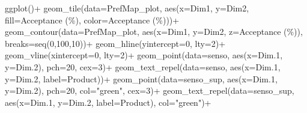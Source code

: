 \documentclass[
]{book}
\newenvironment{Shaded}{\begin{snugshade}}{\end{snugshade}}
\newcommand{\AttributeTok}[1]{\textcolor[rgb]{0.77,0.63,0.00}{#1}}
\newcommand{\DecValTok}[1]{\textcolor[rgb]{0.00,0.00,0.81}{#1}}
\newcommand{\FloatTok}[1]{\textcolor[rgb]{0.00,0.00,0.81}{#1}}
\newcommand{\FunctionTok}[1]{\textcolor[rgb]{0.00,0.00,0.00}{#1}}
\newcommand{\NormalTok}[1]{#1}
\newcommand{\SpecialCharTok}[1]{\textcolor[rgb]{0.00,0.00,0.00}{#1}}
\newcommand{\StringTok}[1]{\textcolor[rgb]{0.31,0.60,0.02}{#1}}
\begin{document}
\begin{Shaded}
\begin{Highlighting}[]
\FunctionTok{ggplot}\NormalTok{()}\SpecialCharTok{+}
  \FunctionTok{geom\_tile}\NormalTok{(}\AttributeTok{data=}\NormalTok{PrefMap\_plot, }\FunctionTok{aes}\NormalTok{(}\AttributeTok{x=}\NormalTok{Dim1, }\AttributeTok{y=}\NormalTok{Dim2, }\AttributeTok{fill=}\StringTok{\textasciigrave{}}\AttributeTok{Acceptance (\%)}\StringTok{\textasciigrave{}}\NormalTok{, }\AttributeTok{color=}\StringTok{\textasciigrave{}}\AttributeTok{Acceptance (\%)}\StringTok{\textasciigrave{}}\NormalTok{))}\SpecialCharTok{+}
  \FunctionTok{geom\_contour}\NormalTok{(}\AttributeTok{data=}\NormalTok{PrefMap\_plot, }\FunctionTok{aes}\NormalTok{(}\AttributeTok{x=}\NormalTok{Dim1, }\AttributeTok{y=}\NormalTok{Dim2, }\AttributeTok{z=}\StringTok{\textasciigrave{}}\AttributeTok{Acceptance (\%)}\StringTok{\textasciigrave{}}\NormalTok{), }\AttributeTok{breaks=}\FunctionTok{seq}\NormalTok{(}\DecValTok{0}\NormalTok{,}\DecValTok{100}\NormalTok{,}\DecValTok{10}\NormalTok{))}\SpecialCharTok{+}
  \FunctionTok{geom\_hline}\NormalTok{(}\AttributeTok{yintercept=}\DecValTok{0}\NormalTok{, }\AttributeTok{lty=}\DecValTok{2}\NormalTok{)}\SpecialCharTok{+}
  \FunctionTok{geom\_vline}\NormalTok{(}\AttributeTok{xintercept=}\DecValTok{0}\NormalTok{, }\AttributeTok{lty=}\DecValTok{2}\NormalTok{)}\SpecialCharTok{+}
  \FunctionTok{geom\_point}\NormalTok{(}\AttributeTok{data=}\NormalTok{senso, }\FunctionTok{aes}\NormalTok{(}\AttributeTok{x=}\NormalTok{Dim}\FloatTok{.1}\NormalTok{, }\AttributeTok{y=}\NormalTok{Dim}\FloatTok{.2}\NormalTok{), }\AttributeTok{pch=}\DecValTok{20}\NormalTok{, }\AttributeTok{cex=}\DecValTok{3}\NormalTok{)}\SpecialCharTok{+}
  \FunctionTok{geom\_text\_repel}\NormalTok{(}\AttributeTok{data=}\NormalTok{senso, }\FunctionTok{aes}\NormalTok{(}\AttributeTok{x=}\NormalTok{Dim}\FloatTok{.1}\NormalTok{, }\AttributeTok{y=}\NormalTok{Dim}\FloatTok{.2}\NormalTok{, }\AttributeTok{label=}\NormalTok{Product))}\SpecialCharTok{+}
  \FunctionTok{geom\_point}\NormalTok{(}\AttributeTok{data=}\NormalTok{senso\_sup, }\FunctionTok{aes}\NormalTok{(}\AttributeTok{x=}\NormalTok{Dim}\FloatTok{.1}\NormalTok{, }\AttributeTok{y=}\NormalTok{Dim}\FloatTok{.2}\NormalTok{), }\AttributeTok{pch=}\DecValTok{20}\NormalTok{, }\AttributeTok{col=}\StringTok{"green"}\NormalTok{, }\AttributeTok{cex=}\DecValTok{3}\NormalTok{)}\SpecialCharTok{+}
  \FunctionTok{geom\_text\_repel}\NormalTok{(}\AttributeTok{data=}\NormalTok{senso\_sup, }\FunctionTok{aes}\NormalTok{(}\AttributeTok{x=}\NormalTok{Dim}\FloatTok{.1}\NormalTok{, }\AttributeTok{y=}\NormalTok{Dim}\FloatTok{.2}\NormalTok{, }\AttributeTok{label=}\NormalTok{Product), }\AttributeTok{col=}\StringTok{"green"}\NormalTok{)}\SpecialCharTok{+}

\end{Highlighting}
\end{Shaded}
\end{document}
